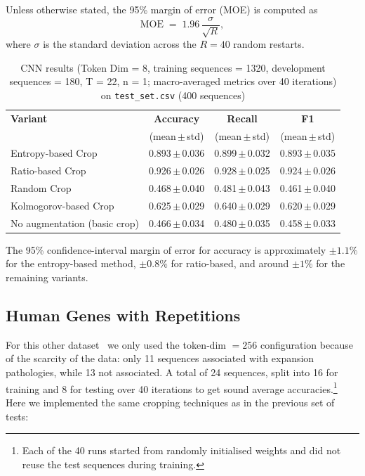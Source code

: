 \documentclass{article}
\theoremstyle{remark}
\begin{document}
Unless otherwise stated, the 95\% margin of error (MOE) is computed as
\begin{equation}
\mathrm{MOE} \;=\; 1.96 \,\frac{\sigma}{\sqrt{R}},
\end{equation}
where \(\sigma\) is the standard deviation across the \(R=40\) random restarts.




\begin{table}[H]
\centering
\caption{CNN results (Token Dim = 8, training sequences = 1320, development sequences = 180, T = 22, n = 1; macro-averaged metrics over 40 iterations) on \texttt{test\_set.csv} (400 sequences)}
\begin{tabular}{l c c c}
\hline
\textbf{Variant}             & \textbf{Accuracy}         & \textbf{Recall}            & \textbf{F1}                 \\
                              & (mean\,$\pm$\,std)        & (mean\,$\pm$\,std)         & (mean\,$\pm$\,std)          \\
\hline
Entropy-based Crop           & 0.893\,$\pm$\,0.036       & 0.899\,$\pm$\,0.032        & 0.893\,$\pm$\,0.035         \\
Ratio-based Crop             & 0.926\,$\pm$\,0.026       & 0.928\,$\pm$\,0.025        & 0.924\,$\pm$\,0.026         \\
Random Crop                  & 0.468\,$\pm$\,0.040       & 0.481\,$\pm$\,0.043        & 0.461\,$\pm$\,0.040         \\
Kolmogorov-based Crop        & 0.625\,$\pm$\,0.029       & 0.640\,$\pm$\,0.029        & 0.620\,$\pm$\,0.029         \\
No augmentation (basic crop) & 0.466\,$\pm$\,0.034       & 0.480\,$\pm$\,0.035        & 0.458\,$\pm$\,0.033         \\
\hline
\end{tabular}
\end{table}

The 95\% confidence-interval margin of error for accuracy is approximately $\pm1.1\%$ for the entropy-based method, $\pm0.8\%$ for ratio-based, and around $\pm1\%$ for the remaining variants.




\subsection{Human Genes with Repetitions}

For this other dataset~\cite{ref15} we only used the token‑dim \(=256\) configuration because of the scarcity of the data: only 11 sequences associated with expansion pathologies, while 13 not associated. A total of 24 sequences, split into 16 for training and 8 for testing over 40 iterations to get sound average accuracies.\footnote{Each of the 40 runs started from randomly initialised weights and did not reuse the test sequences during training.} 
Here we implemented the same cropping techniques as in the previous set of tests:
\end{document}

